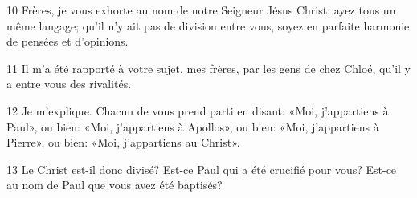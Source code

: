 
10 Frères, je vous exhorte au nom de notre Seigneur Jésus Christ: ayez tous un même langage; qu’il n’y ait pas de division entre vous, soyez en parfaite harmonie de pensées et d’opinions.

11 Il m’a été rapporté à votre sujet, mes frères, par les gens de chez Chloé, qu’il y a entre vous des rivalités.

12 Je m’explique. Chacun de vous prend parti en disant: «Moi, j’appartiens à Paul», ou bien: «Moi, j’appartiens à Apollos», ou bien: «Moi, j’appartiens à Pierre», ou bien: «Moi, j’appartiens au Christ».

13 Le Christ est-il donc divisé? Est-ce Paul qui a été crucifié pour vous? Est-ce au nom de Paul que vous avez été baptisés?